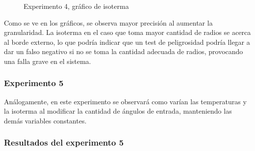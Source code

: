 \begin{figure}[ht]
\begin{center}
\caption{Experimento 4, gráfico de isoterma}
\end{center}
\end{figure}

\par Como se ve en los gráficos, se observa mayor precisión al aumentar la granularidad. La isoterma en el caso que toma mayor cantidad de radios se acerca al borde externo, lo que podría indicar que un test de peligrosidad podría llegar a dar un falso negativo si no se toma la cantidad adecuada de radios, provocando una falla grave en el sistema.

\subsubsection{Experimento 5}

\par Análogamente, en este experimento se observará como varían las temperaturas y la isoterma al modificar la cantidad de ángulos de entrada, manteniendo las demás variables constantes.

\FloatBarrier

\subsubsection{Resultados del experimento 5}

